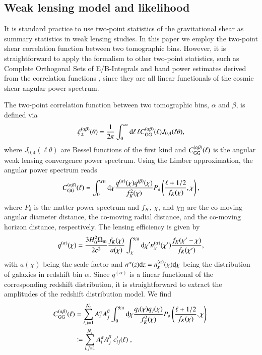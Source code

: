 \documentclass{aa}
\newcommand{\eq}[1]{\begin{equation}  #1 \end{equation}}
\newcommand{\eqa}[1]{\begin{align}   #1 \end{align}}
\newcommand{\br}[1]{\left( #1 \right)}
\newcommand{\dd}{{\rm d}}
\begin{document}
\subsection{Weak lensing model and likelihood}
It is standard practice to use two-point statistics of the gravitational shear as summary statistics in weak lensing studies. In this paper we employ the two-point shear correlation function between two tomographic bins. However, it is straightforward to apply the formalism to other two-point statistics, such as Complete Orthogonal Sets of E/B-Integrals \cite[COSEBIs; ][]{schneider10} and band power estimates derived from the correlation functions \citep{schneider02,becker16,vanUitert18}, since they are all linear functionals of the cosmic shear angular power spectrum. 

The two-point correlation function between two tomographic bins, $\alpha$ and $\beta$, is defined via
\eq{
\label{eq:xi}
\xi_\pm^{(\alpha\beta)}(\theta) = \frac{1}{2\pi}\int_0^{\infty}{\rm d}\ell\, \ell C_{\rm GG}^{(\alpha\beta)}(\ell)J_{0,4}(\ell\theta),
}
where $J_{0,4}(\ell\theta)$ are Bessel functions of the first kind and $C_{\rm GG}^{(\alpha\beta)}(\ell)$ is the angular weak lensing convergence power spectrum.
Using the Limber approximation, the angular power spectrum reads \citep{kaiser92}
\eq{
C_{\rm GG}^{(\alpha \beta)}(\ell) = \int_0^{\chi_{\rm H}} \dd \chi \frac{q^{(\alpha)}(\chi) q^{(\beta)}(\chi)}{f_K^2(\chi)} P_\delta\br{\frac{\ell+1/2}{f_K(\chi)},\chi},
}
where $P_\delta$ is the matter power spectrum and $f_K$, $\chi$, and $\chi_{\rm H}$ are the co-moving angular diameter distance, the co-moving radial distance, and the co-moving horizon distance, respectively. The lensing efficiency is given by
\eq{
q^{(\alpha)}(\chi) = \frac{3H_0^2\Omega_{\rm m}}{2c^2} \frac{f_K(\chi)}{a({\chi})} \int_\chi^{\chi_{\rm H}} \dd \chi^\prime n_\chi^{(\alpha)}(\chi') \frac{f_K(\chi^\prime-\chi)}{f_K(\chi^\prime)},
}
with $a(\chi)$ being the scale factor and $n^\alpha(z){\rm d}z = n_\chi^{(\alpha)}(\chi){\rm d}\chi$ being the distribution of galaxies in redshift bin $\alpha$. Since $q^{(\alpha)}$ is a linear functional of the corresponding redshift distribution, it is straightforward to extract the amplitudes of the redshift distribution model. We find
\eqa{
C_{\rm GG}^{(\alpha \beta)}(\ell) &= \sum_{i,j=1}^{N_z} A_i^\alpha A_j^\beta \int_0^{\chi_{\rm H}} \dd \chi \frac{q_i(\chi) q_j(\chi)}{f_K^2(\chi)} P_\delta\br{\frac{\ell+1/2}{f_K(\chi)},\chi}\;\\
&\coloneqq \sum_{i,j=1}^{N_z} A_i^\alpha A_j^\beta\; c^\prime_{ij}(\ell)\;,
}
\end{document}

